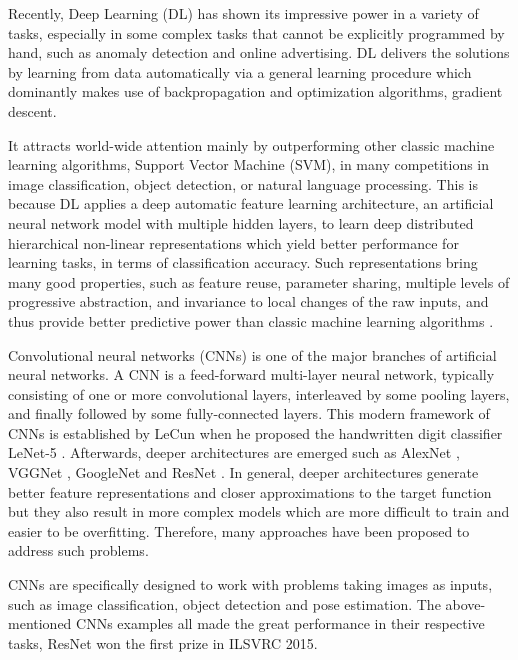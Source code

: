 \documentclass[a4paper,12pt]{article}
\begin{document}
Recently, Deep Learning (DL) has shown its impressive power in a variety of tasks, especially in some complex tasks that cannot be explicitly programmed by hand, such as anomaly detection and online advertising. DL delivers the solutions by learning from data automatically via a general learning procedure which dominantly makes use of backpropagation and optimization algorithms, \eg gradient descent.

It attracts world-wide attention mainly by outperforming other classic machine learning algorithms, \eg Support Vector Machine (SVM),  in many competitions in image classification, object detection, or natural language processing. This is because DL applies a deep automatic feature learning architecture, \ie an artificial neural network model with multiple hidden layers, to learn deep distributed hierarchical non-linear representations which yield better performance for learning tasks, \eg in terms of classification accuracy. Such representations bring many good properties, such as feature reuse, parameter sharing,  multiple levels of progressive abstraction, and invariance to local changes of the raw inputs, and thus provide better predictive power than classic machine learning algorithms \cite{6472238}.

Convolutional neural networks (CNNs) is one of the major branches of artificial neural networks. A CNN is a feed-forward multi-layer neural network, typically consisting of one or more convolutional layers,  interleaved by some pooling layers, and finally followed by some fully-connected layers. This modern framework of CNNs is established by LeCun \etal when he proposed the handwritten digit classifier LeNet-5 \cite{726791}. Afterwards, deeper architectures are emerged such as AlexNet \cite{DBLP:Russakovsky14}, VGGNet \cite{DBLP:SimonyanZ14a}, GoogleNet \cite{DBLP:SzegedyLJSRAEVR14} and ResNet \cite{DBLP:HeZRS15}. In general, deeper architectures generate better feature representations and closer approximations to the target function but they also result in more complex models which are more difficult to train and easier to be overfitting. Therefore, many approaches have been proposed to address such problems.

CNNs are specifically designed to work with problems taking images as inputs, such as image classification, object detection and pose estimation. The above-mentioned CNNs examples all made the great performance in their respective tasks, \eg ResNet won the first prize in ILSVRC 2015.
\end{document}
